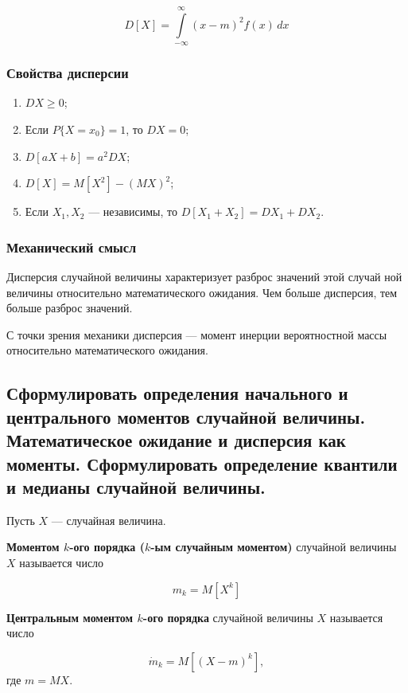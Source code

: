 \begin{equation}
	D[X] = \int\limits_{-\infty}^{\infty}(x - m)^{2}f(x)\,dx
\end{equation}

\subsubsection*{Свойства дисперсии}

\begin{enumerate}
	\item $DX \geqslant 0$;
	\item Если $P\{X = x_{0}\} = 1$, то $DX = 0$;
	\item $D[aX + b] = a^{2}DX$;
	\item $D[X] = M[X^{2}] - (MX)^{2}$;
	\item Если $X_{1}, X_{2}$ --- независимы, то $D[X_{1} + X_{2}] = DX_{1} + DX_{2}$.
\end{enumerate}

\subsubsection*{Механический смысл}

Дисперсия случайной величины характеризует разброс значений этой случай ной величины относительно математического ожидания. Чем больше дисперсия, тем больше разброс значений.

С точки зрения механики дисперсия --- момент инерции вероятностной массы относительно математического ожидания.

\subsection{Сформулировать определения начального и центрального моментов случайной величины. Математическое ожидание и дисперсия как моменты. Сформулировать определение квантили и медианы случайной величины.}

Пусть $X$ --- случайная величина.

\textbf{Моментом $k$-ого порядка ($k$-ым случайным моментом)} случайной величины $X$ называется число

\begin{equation}
	m_{k} = M[X^{k}]
\end{equation}

\textbf{Центральным моментом $k$-ого порядка} случайной величины $X$ называется число

\begin{equation}
	\dot m_{k} = M[(X - m)^{k}],
\end{equation}
где $m = MX$.

